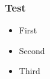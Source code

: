 \documentclass{beamer}
\begin{document}
\begin{frame}
  \frametitle{Test}
  \begin{itemize}[<alert@+>\color{black}]
  \item First
  \item Second
  \item Third
  \end{itemize}
\end{frame}
\end{document}
